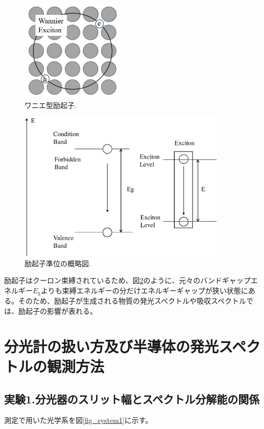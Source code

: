 \documentclass[11pt,a4j]{jsarticle}
\begin{document}
\begin{figure}[h]
 \centering
 \includegraphics[clip,width=5cm]{start_exciton.jpg}
 \caption{ワニエ型励起子.}
 \label{fig_exciton1}
\end{figure}

\begin{figure}[h]
 \centering
 \includegraphics[clip,width=10cm]{start_exciton_binding.eps}
 \caption{励起子準位の概略図.}
 \label{fig_exciton2}
\end{figure}

励起子はクーロン束縛されているため、図\ref{fig_exciton2}のように、元々のバンドギャップエネルギー$E_{\mathrm{g}}$よりも束縛エネルギーの分だけエネルギーギャップが狭い状態にある。そのため、励起子が生成される物質の発光スペクトルや吸収スペクトルでは、励起子の影響が表れる。

\newpage
\section{分光計の扱い方及び半導体の発光スペクトルの観測方法}

\subsection{実験1.分光器のスリット幅とスペクトル分解能の関係}


測定で用いた光学系を図\ref{fig_system1}に示す。
\end{document}
